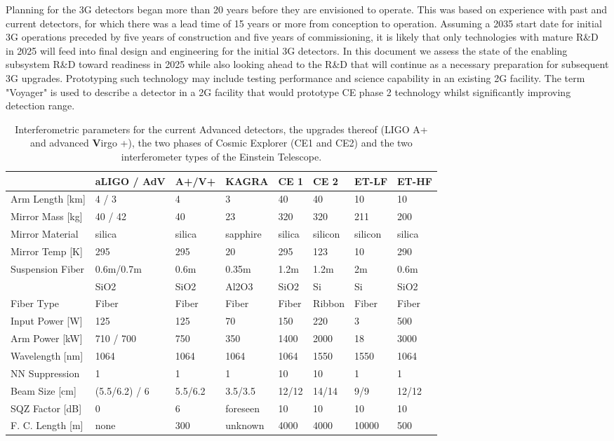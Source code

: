 Planning for the 3G detectors began more than 20 years before they are envisioned to operate. This was based on experience with past and current detectors, for which there was a lead time of 15 years or more from conception to operation. Assuming a 2035 start date for initial 3G operations preceded by five years of construction and five years of commissioning, it is likely that only technologies with mature R\&D in 2025 will feed into final design and engineering for the initial 3G detectors. In this document we assess the state of the enabling subsystem R\&D toward readiness in 2025 while also looking ahead to the R\&D that will continue as a necessary preparation for subsequent 3G upgrades. Prototyping such technology may include testing performance and science capability in an existing 2G facility. The term "Voyager" is used to describe a detector in a 2G facility that would prototype CE phase 2 technology whilst significantly improving detection range. 

\begin{table}[h]
\centering
\begin{tabular}{|l|l|l|p{1.6cm}|l|l|l|l|}
\hline
 &aLIGO / AdV &A+/V+ &KAGRA &CE 1 &CE 2 &ET-LF &ET-HF\\
\hline
Arm Length [km] & 4 / 3 &4& 3& 40& 40& 10 &10\\
\hline
Mirror Mass [kg]& 40 / 42& 40& 23& 320& 320& 211& 200\\
\hline
Mirror Material& silica& silica& sapphire& silica& silicon& silicon& silica\\
\hline
Mirror Temp [K]& 295& 295& 20& 295& 123& 10& 290\\
\hline
Suspension Fiber& 0.6m/0.7m& 0.6m& 0.35m& 1.2m& 1.2m& 2m& 0.6m\\
& SiO2& SiO2&Al2O3&SiO2&Si&Si&SiO2\\
\hline
Fiber Type& Fiber& Fiber& Fiber& Fiber& Ribbon& Fiber& Fiber\\
\hline
Input Power [W]& 125& 125& 70& 150& 220& 3& 500\\
\hline
Arm Power [kW]& 710 / 700& 750& 350& 1400& 2000& 18& 3000\\
\hline
Wavelength [nm]& 1064& 1064& 1064& 1064& 1550& 1550& 1064\\
\hline
NN Suppression& 1& 1& 1& 10& 10& 1& 1\\
\hline
Beam Size [cm]& (5.5/6.2) / 6& 5.5/6.2& 3.5/3.5& 12/12& 14/14& 9/9& 12/12\\
\hline
SQZ Factor [dB]& 0& 6& foreseen& 10& 10& 10& 10\\
\hline
F. C. Length [m]& none& 300& unknown& 4000& 4000& 10000& 500\\
\hline
\end{tabular}
\caption[FutIfos]{Interferometric parameters for the current Advanced detectors, the upgrades thereof (LIGO A+ and advanced {\bf V}irgo +), the two phases of Cosmic Explorer (CE1 and CE2) and the two interferometer types of the Einstein Telescope.}
\label{FutIfos}
\end{table}
